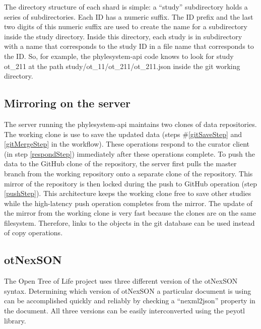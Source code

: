 \documentclass{bioinfo}
\newcommand{\ps}{phylesystem\xspace}
\newcommand{\otol}{Open Tree of Life\xspace}
\newcommand{\nexson}{otNexSON\xspace}
\begin{document}
\begin{methods}
The directory structure of each shard is simple: a ``study'' subdirectory holds 
a series of subdirectories.
Each ID has a numeric suffix.
The ID prefix and the last two digits of this numeric suffix are used to create the name
    for a subdirectory inside the study directory.
Inside this directory, each study is in subdirectory with a name that corresponds to the study ID
    in a file name that corresponds to the ID.
So, for example, the \ps-api code knows to look for study ot\_211 at the path
    study/ot\_11/ot\_211/ot\_211.json inside the git working directory.

\subsection*{Mirroring on the server}
The server running the \ps-api maintains two clones of data repositories.
The working clone is use to save the updated data (steps \#\ref{gitSaveStep} and \ref{gitMergeStep}  in the workflow).
These operations respond to the curator client (in step \ref{respondStep}) immediately
    after these operations complete.
To push the data to the GitHub clone of the repository, the server first pulls the master branch from the working repository onto a separate
    clone of the repository.
This mirror of the repository is then locked during the push to GitHub operation (step \ref{pushStep}).
This architecture keeps the working clone free to save other studies while the high-latency push operation completes from the mirror.
The update of the mirror from the working clone is very fast because the clones are on the same filesystem.
Therefore, links to the objects in the git database can be used instead of copy operations.

\subsection*{\nexson}
The \otol project uses three different version of the \nexson syntax.
Determining which version of \nexson a particular document is using
    can be accomplished quickly and reliably by checking a  ``nexml2json'' property in the document.
All three versions can be easily interconverted using the peyotl library.


\end{methods}
\end{document}
